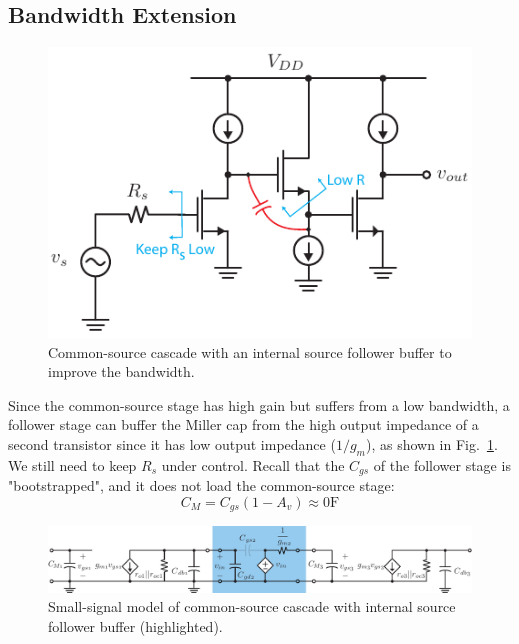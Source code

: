 \subsection{Bandwidth Extension}
\begin{figure}[tb]
\centering
\includegraphics[scale=1]{55cs_cd_cs_casc}
\caption{Common-source cascade with an internal source follower buffer to improve the bandwidth.} \label{fig:55cs_cd_cs_casc}
\end{figure}
Since the common-source stage has high gain but suffers from a low bandwidth, a follower stage can buffer the Miller cap from the high output impedance of a second transistor since it has low output impedance ($1/g_m$), as shown in Fig.~\ref{fig:55cs_cd_cs_casc}.  We still need to keep $R_s$ under control.  Recall that the $C_{gs}$ of the follower stage is "bootstrapped", and it does not load the common-source stage:
\begin{equation}
	C_M = C_{gs} (1 - A_v) \approx 0 \mathrm{F}
\end{equation}
\begin{figure}[tb]
\centering
\includegraphics[width=\columnwidth]{5cs_cd_cs_casc_ss_miller}
\caption{Small-signal model of common-source cascade with internal source follower buffer (highlighted).}
\label{fig:5cs_cd_cs_casc_ss_miller}
\end{figure}
